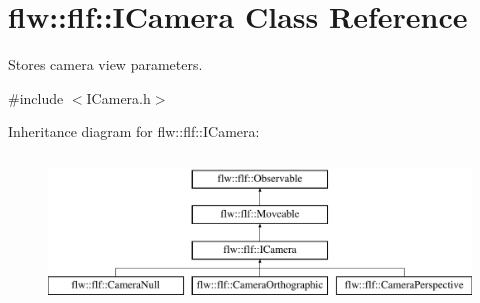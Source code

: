\hypertarget{classflw_1_1flf_1_1ICamera}{}\section{flw\+:\+:flf\+:\+:I\+Camera Class Reference}
\label{classflw_1_1flf_1_1ICamera}


Stores camera view parameters.  




{\ttfamily \#include $<$I\+Camera.\+h$>$}

Inheritance diagram for flw\+:\+:flf\+:\+:I\+Camera\+:\begin{figure}[H]
\begin{center}
\leavevmode
\includegraphics[height=4.000000cm]{classflw_1_1flf_1_1ICamera}
\end{center}
\end{figure}
